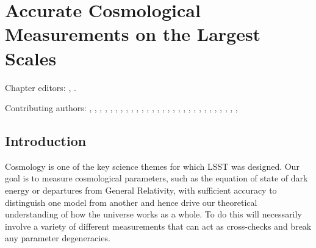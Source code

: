 
\chapter[Cosmology]{Accurate Cosmological Measurements on the Largest Scales}
\def\chpname{cosmo}\label{chp:\chpname}

Chapter editors:
,
.

Contributing authors:
,
,
,
,
,
,
,
,
,
,
,
,
,
,
,
,
,
,
,
,
,
,
,
,
,
,
,
,
,

%


\section{Introduction}
\label{sec:\chpname:intro}

Cosmology is one of the key science themes for which LSST was
designed. Our goal is to measure cosmological parameters, such as the
equation of state of dark energy or departures from General
Relativity, with sufficient accuracy to distinguish one model from
another and hence drive our theoretical understanding of how the
universe works as a whole. To do this will necessarily involve a
variety of different measurements that can act as cross-checks and break
any parameter degeneracies.

